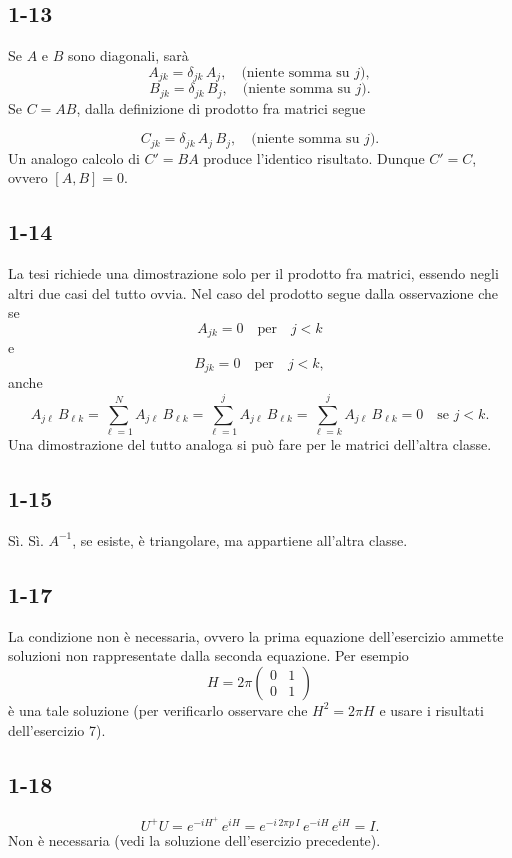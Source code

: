 \documentclass[11pt, a4paper]{book}
\numberwithin{equation}{section}
\begin{document}
\subsection*{1-13}
Se $A$ e $B$ sono diagonali, sarà
\[
A_{jk} = \delta_{jk}\,A_j, \quad \text{(niente somma su }j\text{)},
\]
\[
B_{jk} = \delta_{jk}\,B_j, \quad \text{(niente somma su }j\text{)}.
\]
Se $C=AB$, dalla definizione di prodotto fra matrici segue


\[
C_{jk} = \delta_{jk}\,A_j\,B_j, \quad \text{(niente somma su }j\text{)}.
\]
Un analogo calcolo di $C' = BA$ produce l'identico risultato. Dunque
$C'=C$, ovvero $[A,B] = 0$.

\subsection*{1-14}
La tesi richiede una dimostrazione solo per il prodotto fra matrici,
essendo negli altri due casi del tutto ovvia. Nel caso del prodotto segue
dalla osservazione che se
\[
A_{jk} = 0 \quad \text{per} \quad j < k
\]
e
\[
B_{jk} = 0 \quad \text{per} \quad j < k,
\]
anche
\[
A_{j\ell}\,B_{\ell k}
= \sum_{\ell=1}^{N} A_{j\ell}\,B_{\ell k}
= \sum_{\ell=1}^{j} A_{j\ell}\,B_{\ell k}
= \sum_{\ell=k}^{j} A_{j\ell}\,B_{\ell k} = 0
\quad \text{se } j < k.
\]
Una dimostrazione del tutto analoga si può fare per le matrici dell'altra
classe.

\subsection*{1-15}
Sì. Sì. $A^{-1}$, se esiste, è triangolare, ma appartiene all'altra
classe.

\subsection*{1-17}
La condizione non è necessaria, ovvero la prima equazione dell'esercizio
ammette soluzioni non rappresentate dalla seconda equazione. Per esempio
\[
H = 2\pi\begin{pmatrix} 0 & 1 \\ 0 & 1 \end{pmatrix}
\]
è una tale soluzione (per verificarlo osservare che $H^2 = 2\pi H$ e
usare i risultati dell'esercizio 7).

\subsection*{1-18}
\[
U^+U = e^{-iH^+}\,e^{iH}
= e^{-i\,2\pi p\,I}\,e^{-iH}\,e^{iH} = I.
\]
Non è necessaria (vedi la soluzione dell'esercizio precedente).
\end{document}
